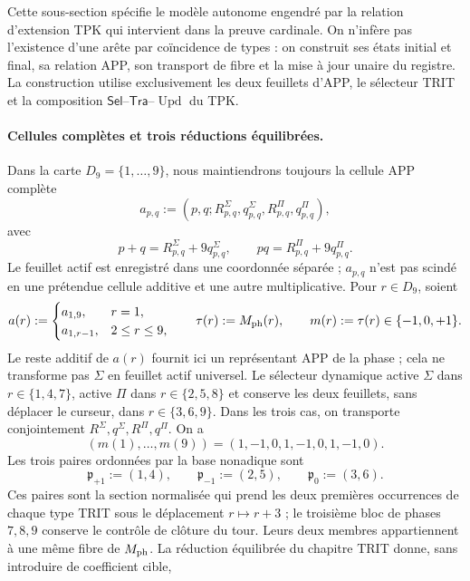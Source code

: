 Cette sous-section spécifie le modèle autonome engendré par la relation
d’extension TPK qui intervient dans la preuve cardinale. On n’infère pas l’existence
d’une arête par coïncidence de types : on construit ses états initial et final,
sa relation APP, son transport de fibre et la mise à jour unaire du registre.
La construction utilise exclusivement les deux feuillets d’APP, le sélecteur TRIT
et la composition \(\mathsf{Sel}\)--\(\mathsf{Tra}\)--\(\operatorname{Upd}\) du TPK.

\paragraph{Cellules complètes et trois réductions équilibrées.}
Dans la carte \(D_9=\{1,\ldots,9\}\), nous maintiendrons toujours la cellule APP complète
\[
 a_{p,q}:=(p,q;R^\Sigma_{p,q},q^\Sigma_{p,q},
                 R^\Pi_{p,q},q^\Pi_{p,q}),
\]
avec
\[
 p+q=R^\Sigma_{p,q}+9q^\Sigma_{p,q},\qquad
 pq=R^\Pi_{p,q}+9q^\Pi_{p,q}.
\]
Le feuillet actif est enregistré dans une coordonnée séparée ; \(a_{p,q}\) n'est pas scindé en une prétendue cellule additive et une autre multiplicative. Pour \(r\in D_9\), soient
\begin{equation}
 a(r):=
 \begin{cases}
  a_{1,9},&r=1,\\
  a_{1,r-1},&2\le r\le9,
 \end{cases}
 \qquad
 \tau(r):=M_{\rm ph}(r),
 \qquad
 m(r):=\tau(r)\in\{-1,0,+1\}.
 \label{ix:eq:celula-completa-fase-ch}
\end{equation}
Le reste additif de \(a(r)\) fournit ici un représentant APP de la
phase ; cela ne transforme pas \(\Sigma\) en feuillet actif universel. Le sélecteur
dynamique active \(\Sigma\) dans \(r\in\{1,4,7\}\), active \(\Pi\) dans
\(r\in\{2,5,8\}\) et conserve les deux feuillets, sans déplacer le curseur, dans
\(r\in\{3,6,9\}\). Dans les trois cas, on transporte conjointement
\(R^\Sigma,q^\Sigma,R^\Pi,q^\Pi\). On a
\[
 (m(1),\ldots,m(9))=(1,-1,0,1,-1,0,1,-1,0).
\]
Les trois paires ordonnées par la base nonadique sont
\begin{equation}
 \mathfrak p_{+1}:=(1,4),\qquad
 \mathfrak p_{-1}:=(2,5),\qquad
 \mathfrak p_{0}:=(3,6).
 \label{ix:eq:tres-pares-internos-ch}
\end{equation}
Ces paires sont la section normalisée qui prend les deux premières occurrences de chaque type TRIT sous le déplacement \(r\mapsto r+3\) ; le troisième bloc de phases \(7,8,9\) conserve le contrôle de clôture du tour. Leurs deux membres appartiennent à une même fibre de \(M_{\rm ph}\). La réduction équilibrée du chapitre TRIT donne, sans introduire de coefficient cible,
